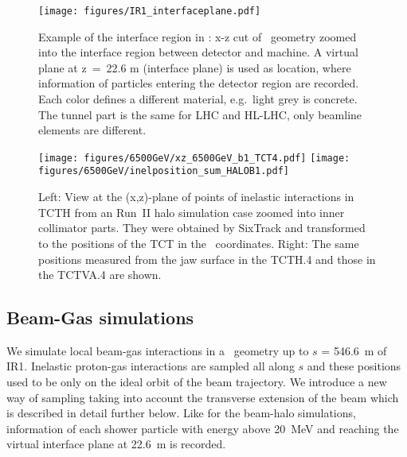 

\begin{figure}%
\begin{center}
\texttt{[image: figures/IR1\_interfaceplane.pdf]}
\end{center}
\vspace{-0.6cm}
 \caption{Example of the interface region in \fluka: x-z cut of \fluka~geometry zoomed into the interface region between detector and machine. A virtual plane at z~=~22.6 m (interface plane) is used as location, where information of particles entering the detector region are recorded. Each color defines a different material, e.g.~light grey is concrete. The tunnel part is the same for LHC and HL-LHC, only beamline elements are different.
  \label{flukaGeo_nominal}}
\end{figure}


\begin{figure}%
\begin{center}
  \texttt{[image: figures/6500GeV/xz\_6500GeV\_b1\_TCT4.pdf]}
  \texttt{[image: figures/6500GeV/inelposition\_sum\_HALOB1.pdf]}
\end{center}
\vspace{-0.6cm}
 \caption{Left: View at the (x,z)-plane of points of inelastic interactions in TCTH from an Run~II halo simulation case zoomed into inner collimator parts. They were obtained by SixTrack and transformed to the positions of the TCT in the \fluka~coordinates. Right: The same positions measured from the jaw surface in the TCTH.4 and those in the TCTVA.4 are shown.
  \label{tctHits}}
\end{figure}


\subsection{Beam-Gas simulations \label{BGdescript}}

We simulate local beam-gas interactions in a \fluka~geometry up to $s$ = 546.6~m of IR1. Inelastic proton-gas interactions are sampled all along $s$ and these positions used to be only on the ideal orbit of the beam trajectory. We introduce a new way of sampling taking into account the transverse extension of the beam which is described in detail further below.
Like for the beam-halo simulations, information of each shower particle with energy above 20~MeV and reaching the virtual interface plane at 22.6~m is recorded.

